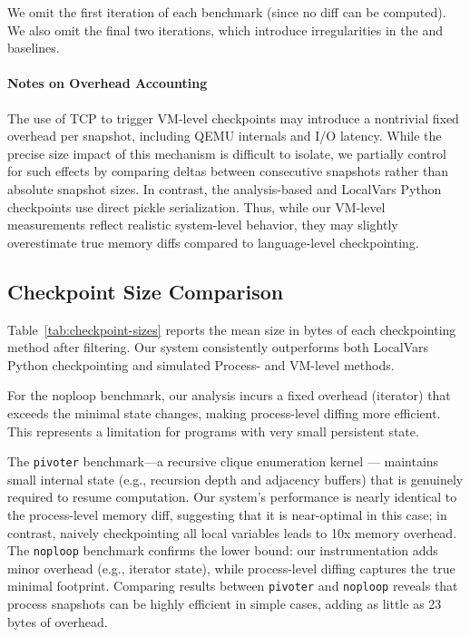 We omit the first iteration of each benchmark (since no diff can be computed). We also omit the final two iterations, which introduce irregularities in the {\PROCDIFF} and {\VMDIFF} baselines.

\paragraph{Notes on Overhead Accounting}
The use of TCP to trigger VM-level checkpoints may introduce a nontrivial fixed overhead per snapshot, including QEMU internals and I/O latency. While the precise size impact of this mechanism is difficult to isolate, we partially control for such effects by comparing deltas between consecutive snapshots rather than absolute snapshot sizes. In contrast, the analysis-based and LocalVars Python checkpoints use direct pickle serialization. Thus, while our VM-level measurements reflect realistic system-level behavior, they may slightly overestimate true memory diffs compared to language-level checkpointing.

\subsection{Checkpoint Size Comparison}

Table~\ref{tab:checkpoint-sizes} reports the mean size in bytes of each checkpointing method after filtering. Our system consistently outperforms both LocalVars Python checkpointing and simulated Process- and VM-level methods.

For the noploop benchmark, our analysis incurs a fixed overhead (iterator) that exceeds 
the minimal state changes, making process-level diffing more efficient. This 
represents a limitation for programs with very small persistent state.

The \texttt{pivoter} benchmark---a recursive clique enumeration kernel --- maintains small internal state (e.g., recursion depth and adjacency buffers) that is genuinely required to resume computation. Our system’s performance is nearly identical to the process-level memory diff, suggesting that it is near-optimal in this case; in contrast, naively checkpointing all local variables leads to 10x memory overhead. The \texttt{noploop} benchmark confirms the lower bound: our instrumentation adds minor overhead (e.g., iterator state), while process-level diffing captures the true minimal footprint. Comparing \texttt{\PROCDIFF} results between \texttt{pivoter} and \texttt{noploop} reveals that process snapshots can be highly efficient in simple cases, adding as little as 23 bytes of overhead.

